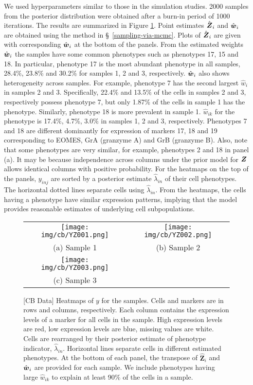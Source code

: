\documentclass[12pt,]{article}
\def\Z{\bm{Z}}
\newcommand{\bZ}{\mbox{\boldmath $Z$}}
\newcommand{\bw}{\mbox{\boldmath $w$}}
\begin{document}
We used hyperparameters similar to those in the simulation studies.  2000
samples from the posterior distribution were obtained after a burn-in period of
1000 iterations. The results are summarized in Figure \ref{fig:cb-post-Z}.
Point estimates $\hat{\bZ}_i$ and $\hat{\bw}_i$ are obtained using the method
in \S~\ref{sampling-via-mcmc}.
Plots of $\hat{\bZ}_i$ are given with corresponding $\hat{\bw}_i$ at the bottom
of the panels.  From the estimated weights $\hat{\bw}_i$ the samples have some
common phenotypes such as phenotypes 17, 15 and 18.  In particular, phenotype
17 is the most abundant phenotype in all samples, 28.4\%, 23.8\% and 30.2\% for
samples 1, 2 and 3, respectively.  $\hat{\bw}_i$ also shows heterogeneity
across samples.  For example, phenotype 7 has the second largest $\hat{w}_i$ in
samples 2 and 3. Specifically, 22.4\% and 13.5\% of the cells in samples 2 and
3, respectively possess phenotype 7, but only 1.87\% of the cells in sample 1
has the phenotype.  Similarly, phenotype 18 is more prevalent in sample 1.
$\hat{w}_{ik}$ for the phenotype is 17.4\%, 4.7\%, 3.0\% in samples 1, 2 and 3,
respectively.  Phenotypes 7 and 18 are different dominantly for expression of
markers 17, 18 and 19 corresponding to EOMES, GrA (granzyme A) and GrB
(granzyme B).  Also, note that some phenotypes are very similar, for example,
phenotypes 2 and 18 in panel (a).  It may be because independence across
columns under the prior model for $\bZ$ allows identical columns with positive
probability.  For the heatmaps on the top of the panels, $y_{inj}$ are sorted
by a posterior estimate $\hat{\lambda}_{in}$ of their cell phenotypes. The
horizontal dotted lines separate cells using $\hat{\lambda}_{in}$.  From the
heatmaps, the cells having a phenotype have similar expression patterns,
implying that the model provides reasonable estimates of underlying cell
subpopulations.
\begin{figure}%
\begin{center}
  \begin{tabular}{cc}
  \texttt{[image: img/cb/YZ001.png]}&
  \texttt{[image: img/cb/YZ002.png]}\\
  (a) Sample 1 & (b) Sample 2 \\
  \texttt{[image: img/cb/YZ003.png]} &\\
  (c) Sample 3 & \\
  \end{tabular}
\end{center}
\vspace{-0.05in}
\caption{[CB Data]  Heatmaps of $y$ for the samples. Cells and markers are in
rows and columns, respectively. Each column contains the expression levels of
a marker for all cells in the sample. High expression levels are red, low
expression levels are blue, missing values are white.   Cells are rearranged
by their posterior estimate of phenotype indicator, $\hat{\lambda}_{in}$.
Horizontal lines separate cells in different estimated phenotypes.
At the bottom of each panel, the transpose of $\hat{\Z}_i$
and $\hat{\bw}_i$ are provided for each sample. We include phenotypes having
large $\hat{w}_{ik}$ to explain at least 90\% of the cells in a sample.}
\label{fig:cb-post-Z}
\end{figure}
\end{document}
